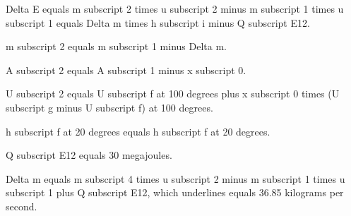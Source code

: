 Delta E equals m subscript 2 times u subscript 2 minus m subscript 1 times u subscript 1 equals Delta m times h subscript i minus Q subscript E12.

m subscript 2 equals m subscript 1 minus Delta m.

A subscript 2 equals A subscript 1 minus x subscript 0.

U subscript 2 equals U subscript f at 100 degrees plus x subscript 0 times (U subscript g minus U subscript f) at 100 degrees.

h subscript f at 20 degrees equals h subscript f at 20 degrees.

Q subscript E12 equals 30 megajoules.

Delta m equals m subscript 4 times u subscript 2 minus m subscript 1 times u subscript 1 plus Q subscript E12, which underlines equals 36.85 kilograms per second.